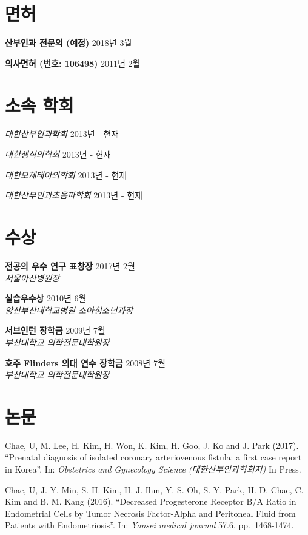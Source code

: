 \documentclass[12pt,]{article}
\begin{document}
\section{면허}

\textbf{산부인과 전문의 (예정)} \hfill 2018년 3월

\textbf{의사면허 (번호: 106498)} \hfill 2011년 2월

\section{소속 학회}\label{-}

\emph{대한산부인과학회} \hfill 2013년 - 현재

\emph{대한생식의학회} \hfill 2013년 - 현재

\emph{대한모체태아의학회} \hfill 2013년 - 현재

\emph{대한산부인과초음파학회} \hfill 2013년 - 현재

\section{수상}

\textbf{전공의 우수 연구 표창장} \hfill 2017년 2월\\
\emph{서울아산병원장}

\textbf{실습우수상} \hfill 2010년 6월\\
\emph{양산부산대학교병원 소아청소년과장}

\textbf{서브인턴 장학금} \hfill 2009년 7월\\
\emph{부산대학교 의학전문대학원장}

\textbf{호주 Flinders 의대 연수 장학금} \hfill 2008년 7월\\
\emph{부산대학교 의학전문대학원장}

\section{논문}

Chae, U, M. Lee, H. Kim, H. Won, K. Kim, H. Goo, J. Ko and J. Park
(2017). ``Prenatal diagnosis of isolated coronary arteriovenous fistula:
a first case report in Korea''. In: \emph{Obstetrics and Gynecology
Science (대한산부인과학회지)} In Press.

Chae, U, J. Y. Min, S. H. Kim, H. J. Ihm, Y. S. Oh, S. Y. Park, H. D.
Chae, C. Kim and B. M. Kang (2016). ``Decreased Progesterone Receptor
B/A Ratio in Endometrial Cells by Tumor Necrosis Factor-Alpha and
Peritoneal Fluid from Patients with Endometriosis''. In: \emph{Yonsei
medical journal} 57.6, pp.~1468-1474.
\end{document}
